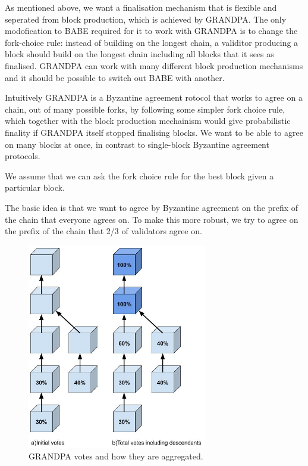 As mentioned above, we want a finalisation mechanism that is flexible and seperated from block production, which is achieved by GRANDPA. The only modofication to BABE required for it to work with GRANDPA is to change the fork-choice rule: instead of building on the longest chain, a validitor producing a block should build on the longest chain including all blocks that it sees as finalised. GRANDPA can work with many different block production mechanisms and it should be possible to switch out BABE with another.

Intuitively GRANDPA is a Byzantine agreement rotocol that works to agree on a chain, out of many possible forks, by following some simpler fork choice rule, which together with the block production mechainism would give probabilistic finality if GRANDPA itself stopped finalising blocks. We want to be able to agree on many blocks at once, in contrast to single-block Byzantine agreement protocols.

We assume that we can ask the fork choice rule for the best block given a particular block. 

The basic idea is that we want to agree by Byzantine agreement on the prefix of the chain that everyone agrees on. To make this more robust, we try to agree on the prefix of the chain that 2/3 of validators agree on.

\begin{figure}[h!]
  \centering
  \includegraphics[width=0.7\textwidth]{images/Grandpa.jpg}
  \caption{GRANDPA votes and how they are aggregated. }
    \label{fig:grandpa}
\end{figure}

